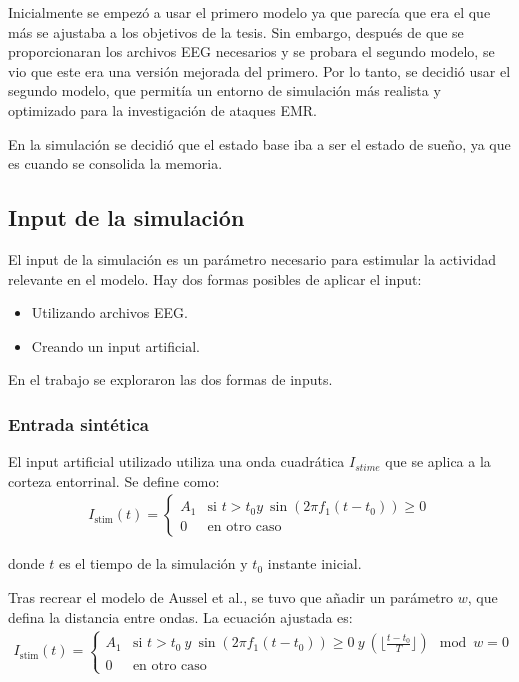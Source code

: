 \documentclass[12pt, letterpaper]{article}
\begin{document}
Inicialmente se empezó a usar el primero modelo ya que parecía que era el que más se ajustaba a los objetivos de la tesis. Sin embargo, después de que se proporcionaran los archivos EEG necesarios y se probara el segundo modelo, se vio que este era una versión mejorada del primero. Por lo tanto, se decidió usar el segundo modelo, que permitía un entorno de simulación más realista y optimizado para la investigación de ataques EMR.\@ 

En la simulación se decidió que el estado base iba a ser el estado de sueño, ya que es cuando se consolida la memoria.

\subsection{Input de la simulación}
El input de la simulación es un parámetro necesario para estimular la actividad relevante en el modelo. Hay dos formas posibles de aplicar el input:
\begin{itemize}
    \item Utilizando archivos EEG.\@
    \item Creando un input artificial.
\end{itemize}

En el trabajo se exploraron las dos formas de inputs. 

\subsubsection{Entrada sintética}
El input artificial utilizado utiliza una onda cuadrática $I_{stime}$ que se aplica a la corteza entorrinal. Se define como:
\begin{align}
    I_{\text{stim}}(t) = 
    \begin{cases}
        A_1 & \text{si ${t > t_0  y\ \sin(2\pi f_1(t-t_0)) \geq 0}$} \\
        0   & \text{en otro caso}
    \end{cases}
\end{align}

donde $t$ es el tiempo de la simulación y $t_0$ instante inicial.

Tras recrear el modelo de Aussel et al.\@, se tuvo que añadir un parámetro $w$, que defina la distancia entre ondas. La ecuación ajustada es:
\begin{align}
    I_{\text{stim}}(t) = 
    \begin{cases}
        A_1 & \text{si ${t > t_0\ y\ \sin(2\pi f_1(t-t_0)) \geq 0}\ y\ (\lfloor\frac{t-t_0}{T}\rfloor) \mod w = 0$} \\
        0 & \text{en otro caso}
    \end{cases}
\end{align}
\end{document}
